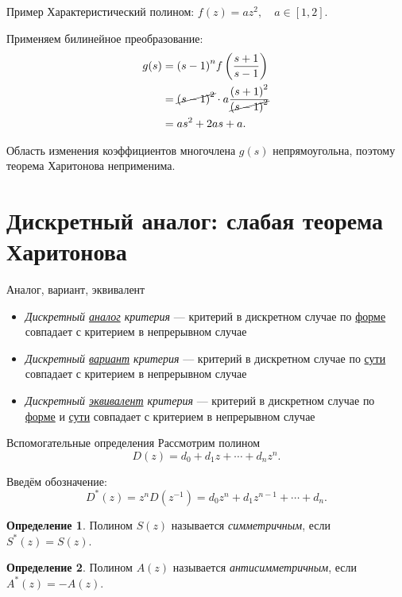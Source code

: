 \documentclass[notheorems,aspectratio=169]{beamer}
\theoremstyle{definition}
\newtheorem{definition}{Определение}
\newcommand{\paren}[1]{\left(#1\right)}
\renewcommand{\emph}[1]{\uline{#1}}
\begin{document}
\begin{frame}{Пример}
  Характеристический полином: $f(z) = az^2, \quad a \in [1, 2]$.

  Применяем билинейное преобразование:
  \begin{equation*}
    \begin{aligned}
      g(s) &= {(s-1)}^n f\paren{\frac{s+1}{s-1}} \\
      &= \cancel{{(s - 1)}^2} \cdot a \frac{{(s + 1)}^2}{\cancel{{(s - 1)}^2}} \\
      &= as^2 + 2as + a.
    \end{aligned}
  \end{equation*}

  Область изменения коэффициентов многочлена $g(s)$ непрямоугольна, поэтому теорема Харитонова неприменима.
\end{frame}

\section{Дискретный аналог: слабая теорема Харитонова}

\begin{frame}{Аналог, вариант, эквивалент~\cite{JuryMansour1985}}
  \begin{itemize}
  \item \textit{Дискретный \emph{аналог} критерия} --- критерий в дискретном случае по \emph{форме}
    совпадает с критерием в непрерывном случае
  \item \textit{Дискретный \emph{вариант} критерия} --- критерий в дискретном случае по \emph{сути}
    совпадает с критерием в непрерывном случае
  \item \textit{Дискретный \emph{эквивалент} критерия} --- критерий в дискретном случае по \emph{форме} и \emph{сути}
    совпадает с критерием в непрерывном случае

  \end{itemize}
\end{frame}

\begin{frame}{Вспомогательные определения}
  Рассмотрим полином
  \begin{equation*}
    D(z) = d_0 + d_1 z + \cdots + d_n z^n.
  \end{equation*}

  Введём обозначение:
  \begin{equation*}
    D^*(z) = z^n D(z^{-1}) = d_0 z^n + d_1 z^{n-1} + \cdots + d_n.
  \end{equation*}

  \begin{definition}
    Полином $S(z)$ называется \textit{симметричным}, если $S^*(z) = S(z)$.
  \end{definition}

  \begin{definition}
    Полином $A(z)$ называется \textit{антисимметричным}, если $A^*(z) = -A(z)$.
  \end{definition}
\end{frame}
\end{document}

